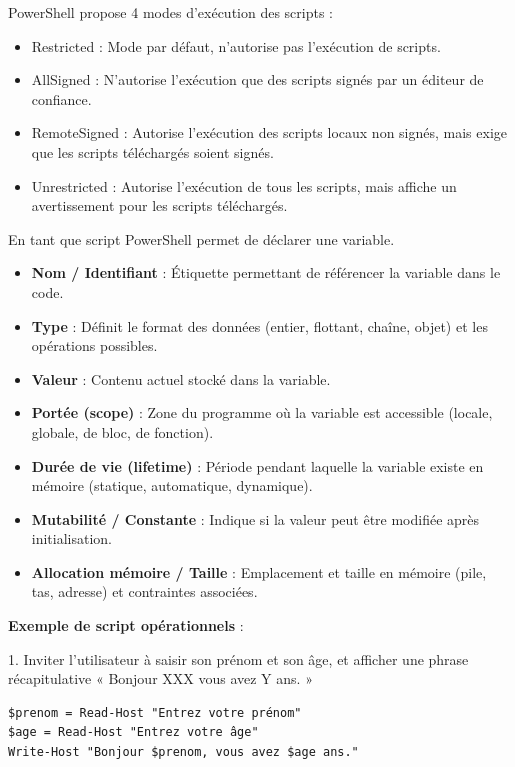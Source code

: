 \newpage

\noindent PowerShell propose 4 modes d'exécution des scripts :
\begin{itemize}
  \item Restricted : Mode par défaut, n'autorise pas l'exécution de scripts.
  \item AllSigned : N'autorise l'exécution que des scripts signés par un éditeur de confiance.
  \item RemoteSigned : Autorise l'exécution des scripts locaux non signés, mais exige que les scripts téléchargés soient signés.
  \item Unrestricted : Autorise l'exécution de tous les scripts, mais affiche un avertissement pour les scripts téléchargés.
\end{itemize}

\vspace{0.5cm}

\noindent En tant que script PowerShell permet de déclarer une variable.
\begin{itemize}
  \item \textbf{Nom / Identifiant} : Étiquette permettant de référencer la variable dans le code.
  \item \textbf{Type} : Définit le format des données (entier, flottant, chaîne, objet) et les opérations possibles.
  \item \textbf{Valeur} : Contenu actuel stocké dans la variable.
  \item \textbf{Portée (scope)} : Zone du programme où la variable est accessible (locale, globale, de bloc, de fonction).
  \item \textbf{Durée de vie (lifetime)} : Période pendant laquelle la variable existe en mémoire (statique, automatique, dynamique).
  \item \textbf{Mutabilité / Constante} : Indique si la valeur peut être modifiée après initialisation.
  \item \textbf{Allocation mémoire / Taille} : Emplacement et taille en mémoire (pile, tas, adresse) et contraintes associées.
\end{itemize}

\vspace{0.5cm}

\noindent \textbf{Exemple de script opérationnels} :

1. Inviter l'utilisateur à saisir son prénom et son âge, et afficher une phrase récapitulative « Bonjour XXX
vous avez Y ans. »

\begin{verbatim}
$prenom = Read-Host "Entrez votre prénom"
$age = Read-Host "Entrez votre âge"
Write-Host "Bonjour $prenom, vous avez $age ans."
\end{verbatim}


